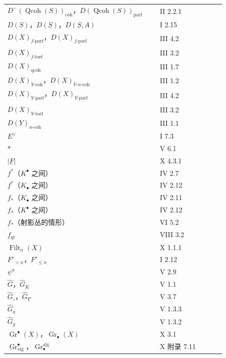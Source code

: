 \begin{longtable}{@{}p{0.65\linewidth}p{0.29\linewidth}@{}}
$D^-(\operatorname{Qcoh}(S))_{\mathrm{coh}}$，$D(\operatorname{Qcoh}(S))_{\mathrm{parf}}$ & II 2.2.1\\
$D(S)$，$D(\underline S)$，$D(\underline S,A)$ & I 2.15\\
$D(X)_{f\text{-}\mathrm{parf}}$，$D(X)_{\underline{f\text{-}\mathrm{parf}}}$ & III 4.2\\
$D(X)_{f\text{-}\mathrm{torf}}$ & III 3.2\\
$D(X)_{\mathrm{qcoh}}$ & III 1.7\\
$D(X)_{Y\text{-}\mathrm{coh}}$，$D(X)_{Y\text{-}n\text{-}\mathrm{coh}}$ & III 1.2\\
$D(X)_{Y\text{-}\mathrm{parf}}$，$D(X)_{Y\text{-}\underline{\mathrm{parf}}}$ & III 4.2\\
$D(X)_{Y\text{-}\mathrm{torf}}$ & III 3.2\\
$D(Y)_{n\text{-}\mathrm{coh}}$ & III 1.1\\[3pt]
$E^\vee$ & I 7.3\\
$*$ & V 6.1\\
$|\underline F|$ & X 4.3.1\\
$f^*$（$K^\bullet$ 之间） & IV 2.7\\
$f^*$（$K_\bullet$ 之间） & IV 2.12\\
$f_*$（$K_\bullet$ 之间） & IV 2.11\\
$f_*$（$K^\bullet$ 之间） & IV 2.12\\
$f_*$（射影丛的情形） & VI 5.2\\
$f_{\mathrm{gr}}$ & VIII 3.2\\
$\operatorname{Filt}_n(X)$ & X 1.1.1\\
$F'_{>n}$，$F'_{\leq n}$ & I 2.12\\
$\psi^a$ & V 2.9\\[3pt]
$\widehat G$，$\widehat G_K$ & V 1.1\\
$\widehat G_\circ$，$\widehat G_{\nabla}$ & V 3.7\\
$\widehat G_a$ & V 1.3.3\\
$\widehat G_g$ & V 1.3.2\\
$\operatorname{Gr}^{\bullet}(X)$，$\operatorname{Gr}_{\bullet}(X)$ & X 3.1\\
$\operatorname{Gr}^{\bullet}_{\mathrm{alg}}$，$\operatorname{Gr}_{\bullet}^{\mathrm{alg}}$ & X 附录 7.11
\end{longtable}

